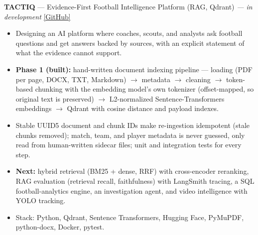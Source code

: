 \documentclass[11pt,a4paper]{article}
\begin{document}
\textbf{TACTIQ} --- Evidence-First Football Intelligence Platform (RAG, Qdrant) \textit{--- in development} \hfill \href{https://github.com/davronbek-malikov/TACTIQ}{[GitHub]}
\begin{itemize}
    \item Designing an AI platform where coaches, scouts, and analysts ask football questions and get answers backed by
sources, with an explicit statement of what the evidence cannot support.
    \item \textbf{Phase 1 (built):} hand-written document indexing pipeline --- loading (PDF per page, DOCX, TXT,
Markdown) $\rightarrow$ metadata $\rightarrow$ cleaning $\rightarrow$ token-based chunking with the embedding model's own
tokenizer (offset-mapped, so original text is preserved) $\rightarrow$ L2-normalized Sentence-Transformers embeddings
$\rightarrow$ Qdrant with cosine distance and payload indexes.
    \item Stable UUID5 document and chunk IDs make re-ingestion idempotent (stale chunks removed); match, team, and player
metadata is never guessed, only read from human-written sidecar files; unit and integration tests for every step.
    \item \textbf{Next:} hybrid retrieval (BM25 + dense, RRF) with cross-encoder reranking, RAG evaluation (retrieval
recall, faithfulness) with LangSmith tracing, a SQL football-analytics engine, an investigation agent, and video
intelligence with YOLO tracking.
    \item Stack: Python, Qdrant, Sentence Transformers, Hugging Face, PyMuPDF, python-docx, Docker, pytest.
\end{itemize}

\medskip
\end{document}
